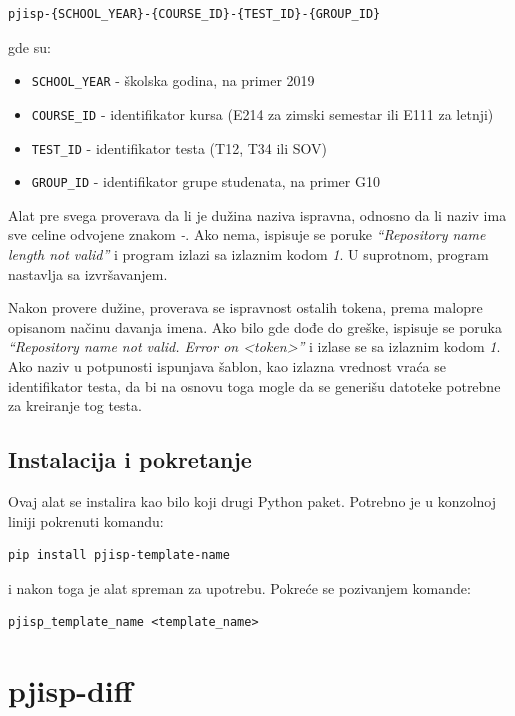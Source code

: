 \documentclass[12pt]{report}
\begin{document}
\begin{verbatim}
pjisp-{SCHOOL_YEAR}-{COURSE_ID}-{TEST_ID}-{GROUP_ID}
\end{verbatim}

gde su:

\begin{itemize}
    \item \texttt{{SCHOOL\_YEAR}} - školska godina, na primer 2019
    \item \texttt{{COURSE\_ID}} - identifikator kursa (E214 za zimski semestar ili E111 za letnji)
    \item \texttt{{TEST\_ID}} - identifikator testa (T12, T34 ili SOV)
    \item \texttt{{GROUP\_ID}} - identifikator grupe studenata, na primer G10
\end{itemize}

Alat pre svega proverava da li je dužina naziva ispravna, odnosno da li naziv ima sve celine odvojene znakom \textit{-}. Ako nema, ispisuje se poruke \textit{``Repository name length not valid''} i program izlazi sa izlaznim kodom \textit{1}. U suprotnom, program nastavlja sa izvršavanjem.

Nakon provere dužine, proverava se ispravnost ostalih tokena, prema malopre opisanom načinu davanja imena. Ako bilo gde dođe do greške, ispisuje se poruka  \textit{``Repository name not valid. Error on <token>''} i izlase se sa izlaznim kodom \textit{1}. Ako naziv u potpunosti ispunjava šablon, kao izlazna vrednost vraća se identifikator testa, da bi na osnovu toga mogle da se generišu datoteke potrebne za kreiranje tog testa.

\subsection{Instalacija i pokretanje}
Ovaj alat se instalira kao bilo koji drugi Python paket. Potrebno je u konzolnoj liniji pokrenuti komandu:

\begin{verbatim}
pip install pjisp-template-name
\end{verbatim}

i nakon toga je alat spreman za upotrebu. Pokreće se pozivanjem komande:

\begin{verbatim}
pjisp_template_name <template_name>
\end{verbatim}

\section{pjisp-diff}
\end{document}
